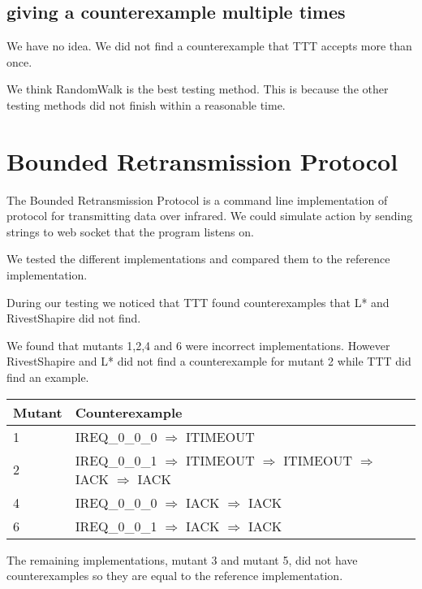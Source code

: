 \documentclass[11pt,a4paper]{article}
\begin{document}
\subsection{giving a counterexample multiple times}
We have no idea. We did not find a counterexample that TTT accepts more than once.

We think RandomWalk is the best testing method. This is because the
other testing methods did not finish within a reasonable time.

\section{Bounded Retransmission Protocol}

The Bounded Retransmission Protocol is a command line implementation
of protocol for transmitting data over infrared. We could simulate
action by sending strings to web socket that the program listens on.

We tested the different implementations and compared them to the
reference implementation.

During our testing we noticed that TTT found counterexamples that L* and
RivestShapire did not find.

We found that mutants 1,2,4 and 6 were incorrect implementations.
However RivestShapire and L* did not find a counterexample for mutant 2
while TTT did find an example.

\begin{center}
\begin{tabular}{l|l}
\textbf{Mutant} & \textbf{Counterexample}\\
\hline
1 & IREQ\_0\_0\_0 $\Rightarrow$ ITIMEOUT\\
2 & IREQ\_0\_0\_1 $\Rightarrow$ ITIMEOUT $\Rightarrow$ ITIMEOUT $\Rightarrow$ IACK $\Rightarrow$ IACK\\
4 & IREQ\_0\_0\_0 $\Rightarrow$ IACK $\Rightarrow$ IACK\\
6 & IREQ\_0\_0\_1 $\Rightarrow$ IACK $\Rightarrow$ IACK\\
\end{tabular}
\end{center}

The remaining implementations, mutant 3 and mutant 5, did not have
counterexamples so they are equal to the reference implementation.
\end{document}
